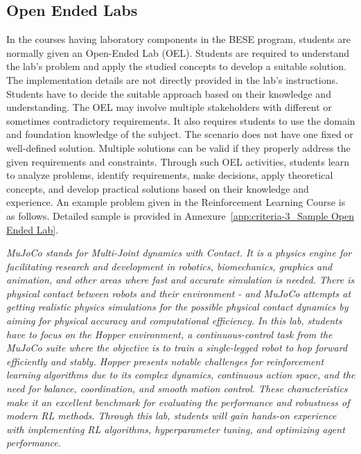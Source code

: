 \hypertarget{sec:4.9othermethods}{%
\subsection{Open Ended Labs}\label{sec:4.9othermethods}}
In the courses having laboratory components in the BESE program, students are normally given an Open-Ended Lab (OEL). Students are required to understand the lab's problem and apply the studied concepts to develop a suitable solution. The implementation details are not directly provided in the lab's instructions. Students have to decide the suitable approach based on their knowledge and understanding. The OEL may involve multiple stakeholders with different or sometimes contradictory requirements. It also requires students to use the domain and foundation knowledge of the subject. The scenario does not have one fixed or well-defined solution. Multiple solutions can be valid if they properly address the given requirements and constraints. Through such OEL activities, students learn to analyze problems, identify requirements, make decisions, apply theoretical concepts, and develop practical solutions based on their knowledge and experience. An example problem given in the Reinforcement Learning Course is as follows. Detailed sample is provided in Annexure~\ref{app:criteria-3_Sample Open Ended Lab}.

\emph{MuJoCo stands for Multi-Joint dynamics with Contact. It is a physics engine for facilitating research and development in robotics, biomechanics, graphics and animation, and other areas where fast and accurate simulation is needed. There is physical contact between robots and their environment - and MuJoCo attempts at getting realistic physics simulations for the possible physical contact dynamics by aiming for physical accuracy and computational efficiency. In this lab, students have to focus on the Hopper environment, a continuous-control task from the MuJoCo suite where the objective is to train a single-legged robot to hop forward efficiently and stably. Hopper presents notable challenges for reinforcement learning algorithms due to its complex dynamics, continuous action space, and the need for balance, coordination, and smooth motion control. These characteristics make it an excellent benchmark for evaluating the performance and robustness of modern RL methods.  Through this lab, students will gain hands-on experience with implementing RL algorithms, hyperparameter tuning, and optimizing agent performance.}


